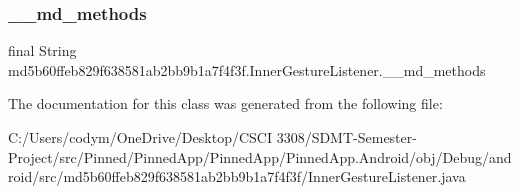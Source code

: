\subsubsection{\texorpdfstring{\+\_\+\+\_\+md\+\_\+methods}{\_\_md\_methods}}
{\footnotesize\ttfamily final String md5b60ffeb829f638581ab2bb9b1a7f4f3f.\+Inner\+Gesture\+Listener.\+\_\+\+\_\+md\+\_\+methods\hspace{0.3cm}{\ttfamily [static]}}



The documentation for this class was generated from the following file\+:\begin{DoxyCompactItemize}
\item 
C\+:/\+Users/codym/\+One\+Drive/\+Desktop/\+C\+S\+C\+I 3308/\+S\+D\+M\+T-\/\+Semester-\/\+Project/src/\+Pinned/\+Pinned\+App/\+Pinned\+App/\+Pinned\+App.\+Android/obj/\+Debug/android/src/md5b60ffeb829f638581ab2bb9b1a7f4f3f/Inner\+Gesture\+Listener.\+java\end{DoxyCompactItemize}
